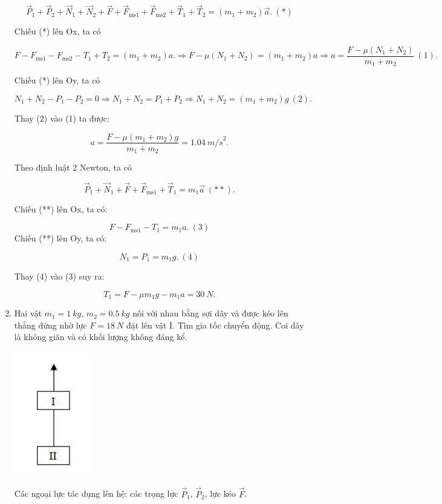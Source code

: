 \begin{enumerate}[label=\bfseries Bài \arabic*:,leftmargin=1.5cm]
{	$$\vec P_1 + \vec P_2 + \vec N_1 + \vec N_2 + \vec F + \vec F_\text{ms1} + \vec F_\text{ms2} + \vec T_1 + \vec T_2 = (m_1 + m_2)\vec a.\ (*)$$
	
	Chiếu (*) lên Ox, ta có
	
	$$F - F_\text{ms1} - F_\text{ms2} - T_1 + T_2 = (m_1 + m_2)a. \Rightarrow F - \mu(N_1 + N_2) = (m_1 + m_2)a\Rightarrow a = \dfrac{F - \mu (N_1 + N_2)}{m_1+m_2}\ (1).$$
	
	Chiếu (*) lên Oy, ta có
	
	$$N_1 + N_2 - P_1 - P_2 =0 \Rightarrow N_1 + N_2 = P_1 + P_2 \Rightarrow N_1 + N_2 = (m_1 + m_2)g\ (2).$$
	
	Thay (2) vào (1) ta được:
	
	$$a = \dfrac{F - \mu (m_1 + m_2)g}{m_1+m_2}= \SI{1,04}{m/s}^2.$$
	
	Theo định luật 2 Newton, ta có
	
	$$\vec P_1 + \vec N_1 + \vec F + \vec F_\text{ms1} + \vec T_1 = m_1 \vec a\ (**).$$
	
	Chiếu (**) lên Ox, ta có:
	
	$$F - F_\text{ms1} - T_1 = m_1a.\ (3)$$
	Chiếu (**) lên Oy, ta có:
	
	$$N_1 = P_1 = m_1g. \ (4)$$
	
	Thay (4) vào (3) suy ra:
	
	$$T_1 = F - \mu m_1 g - m_1 a  = \SI{30}{N}.$$
	
	
}

\item {}


{
	Hai vật $m_1 = \SI{1}{kg}$, $m_2 = \SI{0,5}{kg}$ nối với nhau bằng sợi dây và được kéo lên thẳng đứng nhờ lực $F = \SI{18}{N}$ đặt lên vật I. Tìm gia tốc chuyển động. Coi dây là không giãn và có khối lượng không đáng kể.
	\begin{center}
		\includegraphics[scale=0.8]{../figs/VN10-2022-PH-TP021-8.jpg}
	\end{center}
}

\hideall
{
	Các ngoại lực tác dụng lên hệ: các trọng lực $\vec P_1$, $\vec P_2$, lực kéo $\vec F$.
	
}
\end{enumerate}

